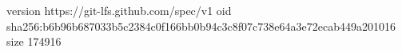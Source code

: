 version https://git-lfs.github.com/spec/v1
oid sha256:b6b96b687033b5c2384c0f166bb0b94c3c8f07c738e64a3e72ecab449a201016
size 174916
